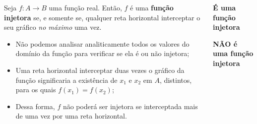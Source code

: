\begin{frame}
  \begin{columns}[onlytextwidth]
    \begin{column}{0.49\textwidth}\vspace*{-0.55cm}
      \begin{theorem}
        Seja $f:A\rightarrow B$ uma função real. Então, $f$ é uma \textbf{função injetora} se, e somente se, qualquer reta horizontal interceptar o seu gráfico \emph{no máximo} uma vez.
      \end{theorem}
      \begin{itemize}
        \item Não podemos analisar analiticamente todos os valores do domínio da função para verificar se ela é ou não injetora;
        \item Uma reta horizontal interceptar duas vezes o gráfico da função significaria a existência de $x_{1}$ e $x_{2}$ em $A$, distintos, para os quais $f(x_{1})=f(x_{2})$;
        \item Dessa forma, $f$ não poderá ser injetora se interceptada mais de uma vez por uma reta horizontal.
      \end{itemize}
    \end{column}
    \begin{column}{0.49\textwidth}\vspace*{-0.65cm}
      \begin{figure}
        \vspace*{-0.8cm}
      \end{figure}
      \begin{center}
        \textbf{É uma função injetora}
      \end{center}
      \vspace*{-0.25cm}
      \begin{figure}
        \vspace*{-0.8cm}
      \end{figure}
      \begin{center}
        \textbf{NÃO é uma função injetora}
      \end{center}
    \end{column}
  \end{columns}
\end{frame}

